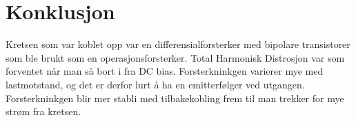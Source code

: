 
\section{Konklusjon}
\label{konklusjon}

Kretsen som var koblet opp var en differensialforsterker med bipolare transistorer som ble brukt som en operasjonsforsterker. Total Harmonisk Distrosjon var som forventet når man så bort i fra DC bias. Forsterkninkgen varierer mye med lastmotstand, og det er derfor lurt å ha en emitterfølger ved utgangen. Forsterkninkgen blir mer stabli med tilbakekobling frem til man trekker for mye strøm fra kretsen.